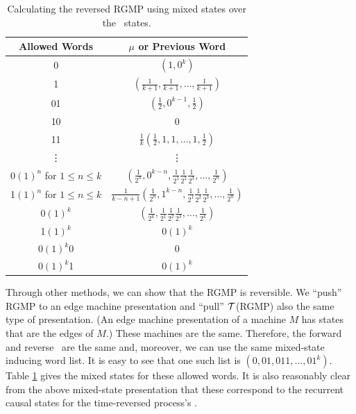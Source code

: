 \begin{table}
\begin{center}
\begin{tabular}{|c|c|}
\hline
Allowed Words & $\mu$ or Previous Word\\
\hline
0 & $(1, 0^k)$\\
1 & $(\frac{1}{k+1}, \frac{1}{k+1}, \ldots, \frac{1}{k+1})$\\
01 & $(\frac{1}{2}, 0^{k-1}, \frac{1}{2})$\\
10 & 0\\
11 & $\frac{1}{k}(\frac{1}{2},1,1,\ldots,1,\frac{1}{2})$\\
\vdots & \vdots \\
0$(1)^n$ for $1 \leq n \leq k$ & $(\frac{1}{2^{n}}, 0^{k-n}, \frac{1}{2^1} \frac{1}{2^2} \frac{1}{2^3}, \ldots,  \frac{1}{2^{n}})$\\
1$(1)^n$ for $1 \leq n \leq k$ & $\frac{1}{k-n+1}(\frac{1}{2^{n}}, 1^{k-n}, \frac{1}{2^1} \frac{1}{2^2} \frac{1}{2^3}, \ldots,  \frac{1}{2^{n}})$\\
0$(1)^{k}$ & $(\frac{1}{2^{k}}, \frac{1}{2^1} \frac{1}{2^2} \frac{1}{2^3}, \ldots,  \frac{1}{2^{k}})$\\
1$(1)^{k}$ & 0$(1)^{k}$\\
0$(1)^{k}$0 & 0\\
0$(1)^{k}$1 & 0$(1)^{k}$\\
\hline
\end{tabular}
\end{center}
\caption{Calculating the reversed RGMP using mixed states over the
  \eM\ states.
  }
\label{tab:RestrictedGMMixedStates}
\end{table}

Through other methods, we can show that the RGMP is reversible. We ``push'' RGMP
to an edge machine presentation and ``pull'' $\mathcal{T}$(RGMP) also the same type of
presentation. (An edge machine presentation of a machine $M$ has states that
are the edges of $M$.) These machines are the same. Therefore, the forward and
reverse \eMs\ are the same and, moreover, we can use the same mixed-state
inducing word list. It is easy to see that one such list is
$(0,01,011,\ldots,01^k)$. Table \ref{tab:RestrictedGMMixedStates} gives the
mixed states for these allowed words. It is also reasonably clear from the above
mixed-state presentation that these correspond to the recurrent causal states
for the time-reversed process's \eM.


